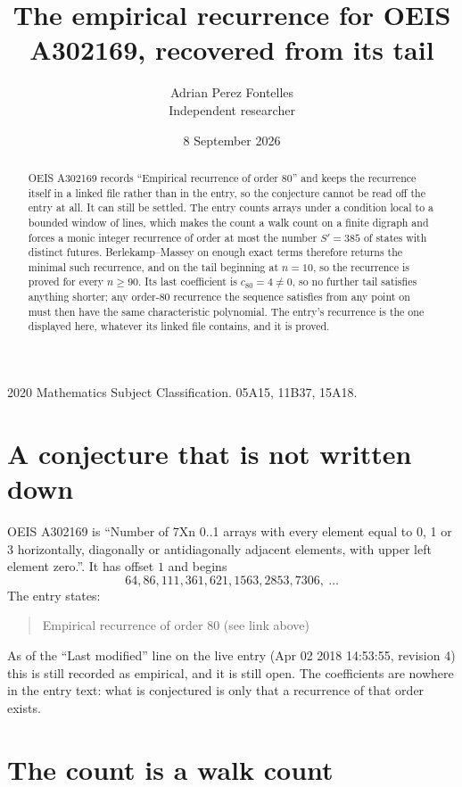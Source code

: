 \documentclass[11pt,a4paper]{article}
\title{The empirical recurrence for OEIS A302169, recovered from its tail}
\author{Adrian Perez Fontelles\\ \small Independent researcher}
\date{8 September 2026}
\theoremstyle{plain}
\theoremstyle{definition}
\begin{document}
\maketitle

\begin{abstract}
OEIS A302169 records ``Empirical recurrence of order $80$'' and keeps the recurrence itself in
a linked file rather than in the entry, so the conjecture cannot be read off the entry at all.
It can still be settled. The entry counts arrays under a condition local to a bounded window of
lines, which makes the count a walk count on a finite digraph and forces a monic integer
recurrence of order at most the number $S'=385$ of states with distinct futures. Berlekamp--Massey on
enough exact terms therefore returns the minimal such recurrence, and on the tail beginning at $n=10$, so the recurrence is proved for every $n\ge90$.
Its last coefficient is $c_{80}=4\neq0$, so no further tail satisfies anything
shorter; any order-$80$ recurrence the sequence satisfies from any point on must then have
the same characteristic polynomial. The entry's recurrence is the one displayed here, whatever
its linked file contains, and it is proved.
\end{abstract}

\noindent\small 2020 Mathematics Subject Classification. 05A15, 11B37, 15A18.\normalsize

\section{A conjecture that is not written down}

OEIS A302169 is ``Number of 7Xn 0..1 arrays with every element equal to 0, 1 or 3 horizontally, diagonally or antidiagonally adjacent elements, with upper left element zero.''. It has offset $1$ and begins
\[
64, 86, 111, 361, 621, 1563, 2853, 7306,\ \dots
\]
The entry states:
\begin{quote}
Empirical recurrence of order 80 (see link above)
\end{quote}
As of the ``Last modified'' line on the live entry (Apr 02 2018 14:53:55, revision 4)
this is still recorded as empirical, and it is still open. The coefficients are nowhere in the
entry text: what is conjectured is only that a recurrence of that order exists.

\section{The count is a walk count}
\end{document}
